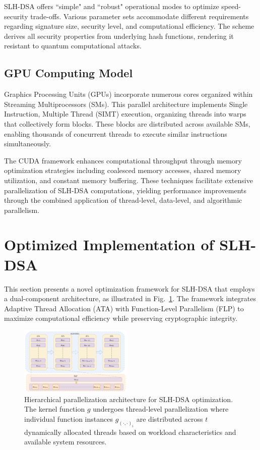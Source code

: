 \documentclass[journal]{IEEEtran}
\begin{document}
SLH-DSA offers ``simple" and ``robust" operational modes to optimize speed-security trade-offs. Various parameter sets accommodate different requirements regarding signature size, security level, and computational efficiency. The scheme derives all security properties from underlying hash functions, rendering it resistant to quantum computational attacks.

\subsection{GPU Computing Model}

Graphics Processing Units (GPUs) incorporate numerous cores organized within Streaming Multiprocessors (SMs). This parallel architecture implements Single Instruction, Multiple Thread (SIMT) execution, organizing threads into warps that collectively form blocks. These blocks are distributed across available SMs, enabling thousands of concurrent threads to execute similar instructions simultaneously.

The CUDA framework enhances computational throughput through memory optimization strategies including coalesced memory accesses, shared memory utilization, and constant memory buffering. These techniques facilitate extensive parallelization of SLH-DSA computations, yielding performance improvements through the combined application of thread-level, data-level, and algorithmic parallelism.

\section{Optimized Implementation of SLH-DSA}\label{sec:implementation}

This section presents a novel optimization framework for SLH-DSA that employs a dual-component architecture, as illustrated in Fig.~\ref{fig:optimization_architecture}. The framework integrates Adaptive Thread Allocation (ATA) with Function-Level Parallelism (FLP) to maximize computational efficiency while preserving cryptographic integrity.

\begin{figure}[htbp]
  \centering
  \includegraphics[width=0.48\textwidth]{./fig/optimize-overview.drawio.pdf}
  \caption{Hierarchical parallelization architecture for SLH-DSA optimization. The kernel function $g$ undergoes thread-level parallelization where individual function instances $g_{(\cdot,\cdot)_i}$ are distributed across $t$ dynamically allocated threads based on workload characteristics and available system resources.}
  \label{fig:optimization_architecture}
\end{figure}
\end{document}
